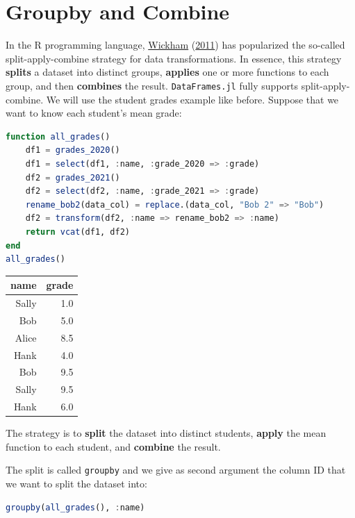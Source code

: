 \documentclass[
  notoc %
]{tufte-book}
\newcommand{\passthrough}[1]{#1}
\begin{document}
\hypertarget{sec:groupby_combine}{%
\section{Groupby and Combine}\label{sec:groupby_combine}}

In the R programming language,
\protect\hyperlink{ref-wickham2011split}{Wickham}
(\protect\hyperlink{ref-wickham2011split}{2011}) has popularized the
so-called split-apply-combine strategy for data transformations. In
essence, this strategy \textbf{splits} a dataset into distinct groups,
\textbf{applies} one or more functions to each group, and then
\textbf{combines} the result. \passthrough{\lstinline!DataFrames.jl!}
fully supports split-apply-combine. We will use the student grades
example like before. Suppose that we want to know each student's mean
grade:

\begin{lstlisting}[language=Julia]
function all_grades()
    df1 = grades_2020()
    df1 = select(df1, :name, :grade_2020 => :grade)
    df2 = grades_2021()
    df2 = select(df2, :name, :grade_2021 => :grade)
    rename_bob2(data_col) = replace.(data_col, "Bob 2" => "Bob")
    df2 = transform(df2, :name => rename_bob2 => :name)
    return vcat(df1, df2)
end
all_grades()
\end{lstlisting}

\begin{longtable}[]{@{}rr@{}}
\toprule
name & grade \\
\midrule
\endhead
Sally & 1.0 \\
Bob & 5.0 \\
Alice & 8.5 \\
Hank & 4.0 \\
Bob & 9.5 \\
Sally & 9.5 \\
Hank & 6.0 \\
\bottomrule
\end{longtable}

The strategy is to \textbf{split} the dataset into distinct students,
\textbf{apply} the mean function to each student, and \textbf{combine}
the result.

The split is called \passthrough{\lstinline!groupby!} and we give as
second argument the column ID that we want to split the dataset into:

\begin{lstlisting}[language=Julia]
groupby(all_grades(), :name)
\end{lstlisting}
\end{document}
